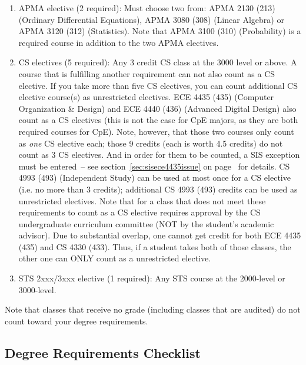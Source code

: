 \documentclass[10pt,letter]{book}
\begin{document}
\begin{enumerate}
\item APMA elective (2 required): Must choose two from: APMA 2130
  (213) (Ordinary Differential Equations), APMA 3080 (308) (Linear
  Algebra) or APMA 3120 (312) (Statistics). Note that APMA 3100 (310)
  (Probability) is a required course in addition to the two APMA
  electives.

\item CS electives (5 required): Any 3 credit CS class at the 3000
  level or above. A course that is fulfilling another requirement can
  not also count as a CS elective. If you take more than five CS
  electives, you can count additional CS elective course(s) as
  unrestricted electives. ECE 4435 (435) (Computer Organization \&
  Design) and ECE 4440 (436) (Advanced Digital Design) also count as a
  CS electives (this is not the case for CpE majors, as they are both
  required courses for CpE). Note, however, that those two courses
  only count as {\em one} CS elective each; those 9 credits (each is
  worth 4.5 credits) do not count as 3 CS electives.  And in order for
  them to be counted, a SIS exception must be entered~-- see
  section~\ref{sec:sisece4435issue} on
  page~\pageref{sec:sisece4435issue} for details.  CS 4993 (493)
  (Independent Study) can be used at most once for a CS elective
  (i.e. no more than 3 credits); additional CS 4993 (493) credits can
  be used as unrestricted electives. Note that for a class that does
  not meet these requirements to count as a CS elective requires
  approval by the CS undergraduate curriculum committee (NOT by the
  student's academic advisor). Due to substantial overlap, one cannot
  get credit for both ECE 4435 (435) and CS 4330 (433). Thus, if a
  student takes both of those classes, the other one can ONLY count as
  a unrestricted elective.

\item STS 2xxx/3xxx elective (1 required): Any STS course at the
  2000-level or 3000-level.
\end{enumerate}
 
Note that classes that receive no grade (including classes that are
audited) do not count toward your degree requirements.

\clearpage
\subsection{Degree Requirements Checklist}
\end{document}
